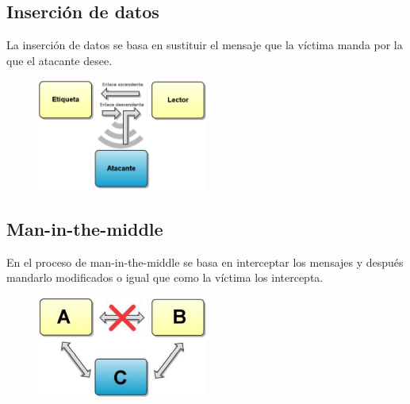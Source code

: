 \subsection{Inserción de datos}
La inserción de datos se basa en sustituir el mensaje que la víctima manda por la que el atacante desee.
\begin{figure}[!h]
	\centering
	\includegraphics[width=0.5\textwidth]{figures/insercion.png}
\end{figure}
\subsection{Man-in-the-middle}
En el proceso de man-in-the-middle se basa en interceptar los mensajes y después mandarlo modificados o igual que como la víctima los intercepta.
\begin{figure}[!h]
	\centering
	\includegraphics[width=0.5\textwidth]{figures/man.png}
\end{figure}


